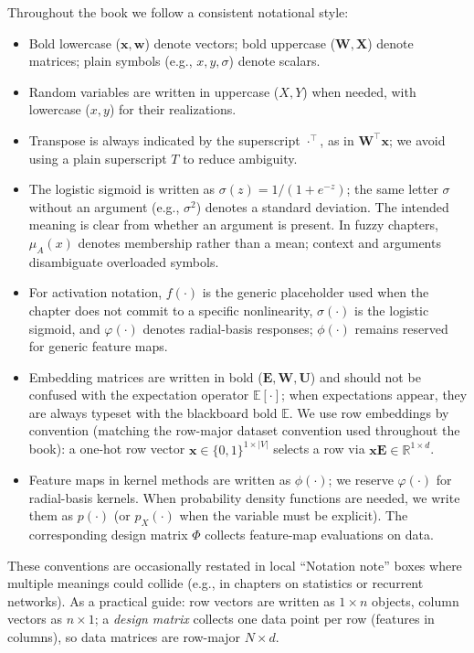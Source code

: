 \vspace{0.5em}
Throughout the book we follow a consistent notational style:
\begin{itemize}
    \item Bold lowercase (\(\mathbf{x}, \mathbf{w}\)) denote vectors; bold uppercase (\(\mathbf{W}, \mathbf{X}\)) denote matrices; plain symbols (e.g., \(x, y, \sigma\)) denote scalars.
    \item Random variables are written in uppercase (\(X, Y\)) when needed, with lowercase (\(x, y\)) for their realizations.
    \item Transpose is always indicated by the superscript \(\cdot^\top\), as in \(\mathbf{W}^\top\mathbf{x}\); we avoid using a plain superscript \(T\) to reduce ambiguity.
    \item The logistic sigmoid is written as \(\sigma(z)=1/(1+e^{-z})\); the same letter \(\sigma\) without an argument (e.g., \(\sigma^2\)) denotes a standard deviation. The intended meaning is clear from whether an argument is present. In fuzzy chapters, \(\mu_A(x)\) denotes membership rather than a mean; context and arguments disambiguate overloaded symbols.
    \item For activation notation, \(f(\cdot)\) is the generic placeholder used when the chapter does not commit to a specific nonlinearity, \(\sigma(\cdot)\) is the logistic sigmoid, and \(\varphi(\cdot)\) denotes radial-basis responses; \(\phi(\cdot)\) remains reserved for generic feature maps.
    \item Embedding matrices are written in bold (\(\mathbf{E}, \mathbf{W}, \mathbf{U}\)) and should not be confused with the expectation operator \(\mathbb{E}[\cdot]\); when expectations appear, they are always typeset with the blackboard bold \(\mathbb{E}\). We use row embeddings by convention (matching the row-major dataset convention used throughout the book): a one-hot row vector \(\mathbf{x}\in\{0,1\}^{1\times |V|}\) selects a row via \(\mathbf{x}\mathbf{E}\in\mathbb{R}^{1\times d}\).
    \item Feature maps in kernel methods are written as \(\phi(\cdot)\); we reserve \(\varphi(\cdot)\) for radial-basis kernels. When probability density functions are needed, we write them as \(p(\cdot)\) (or \(p_X(\cdot)\) when the variable must be explicit). The corresponding design matrix \(\Phi\) collects feature-map evaluations on data.
\end{itemize}
These conventions are occasionally restated in local ``Notation note'' boxes where multiple meanings could collide (e.g., in chapters on statistics or recurrent networks). As a practical guide: row vectors are written as \(1\times n\) objects, column vectors as \(n\times 1\); a \emph{design matrix} collects one data point per row (features in columns), so data matrices are row-major \(N\times d\).

